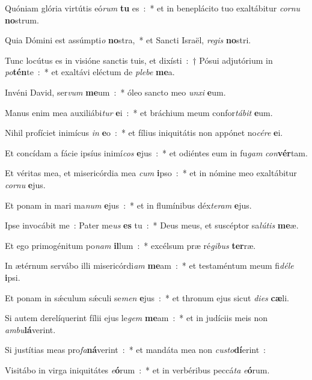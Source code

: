 \item Quóniam glória virtútis eó\emph{rum} \textbf{tu} es~:~* et in beneplácito tuo exaltábitur \emph{cor}\emph{nu} \textbf{no}strum.
\item Quia Dómini est assúmpti\emph{o} \textbf{no}stra,~* et Sancti Israël, \emph{re}\emph{gis} \textbf{no}stri.
\item Tunc locútus es in visióne sanctis tuis, et dixísti~:~† Pósui adjutórium in \emph{po}\textbf{tén}te~:~* et exaltávi eléctum de \emph{ple}\emph{be} \textbf{me}a.
\item Invéni David, ser\emph{vum} \textbf{me}um~:~* óleo sancto meo \emph{un}\emph{xi} \textbf{e}um.
\item Manus enim mea auxiliábi\emph{tur} \textbf{e}i~:~* et bráchium meum confor\emph{tá}\emph{bit} \textbf{e}um.
\item Nihil profíciet inimícus \emph{in} \textbf{e}o~:~* et fílius iniquitátis non appónet no\emph{cé}\emph{re} \textbf{e}i.
\item Et concídam a fácie ipsíus inimí\emph{cos} \textbf{e}jus~:~* et odiéntes eum in fu\emph{gam} \emph{con}\textbf{vér}tam.
\item Et véritas mea, et misericórdia mea \emph{cum} \textbf{i}pso~:~* et in nómine meo exaltábitur \emph{cor}\emph{nu} \textbf{e}jus.
\item Et ponam in mari ma\emph{num} \textbf{e}jus~:~* et in flumínibus déx\emph{te}\emph{ram} \textbf{e}jus.
\item Ipse invocábit me~: Pater me\emph{us} \textbf{es} tu~:~* Deus meus, et suscéptor sa\emph{lú}\emph{tis} \textbf{me}æ.
\item Et ego primogénitum po\emph{nam} \textbf{il}lum~:~* excélsum præ ré\emph{gi}\emph{bus} \textbf{ter}ræ.
\item In ætérnum servábo illi misericórdi\emph{am} \textbf{me}am~:~* et testaméntum meum fi\emph{dé}\emph{le} \textbf{i}psi.
\item Et ponam in sǽculum sǽculi se\emph{men} \textbf{e}jus~:~* et thronum ejus sicut \emph{di}\emph{es} \textbf{cæ}li.
\item Si autem derelíquerint fílii ejus le\emph{gem} \textbf{me}am~:~* et in judíciis meis non \emph{am}\emph{bu}\textbf{lá}verint.
\item Si justítias meas pro\emph{fa}\textbf{ná}verint~:~* et mandáta mea non \emph{cu}\emph{sto}\textbf{dí}erint~:
\item Visitábo in virga iniquitátes \emph{e}\textbf{ó}rum~:~* et in verbéribus peccá\emph{ta} \emph{e}\textbf{ó}rum.
